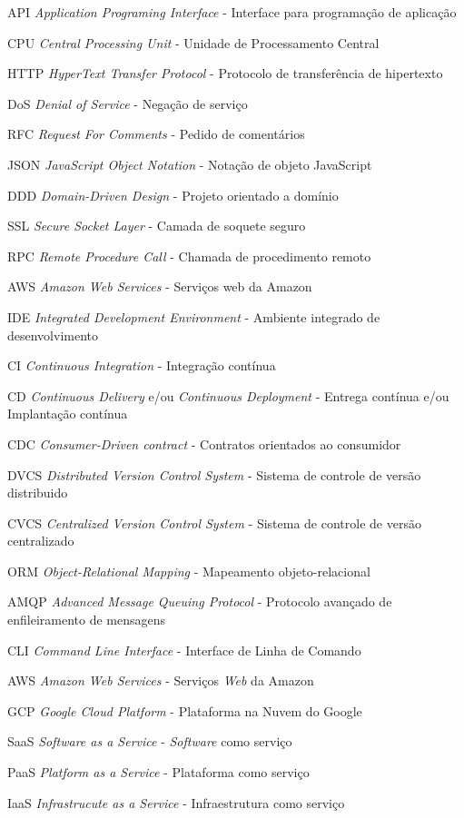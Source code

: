 
\begin{siglas}
	\item[API]{\emph{Application Programing Interface} - Interface para programação de aplicação}
	\item[CPU]{\emph{Central Processing Unit} - Unidade de Processamento Central}
	\item[HTTP]{\emph{HyperText Transfer Protocol} - Protocolo de transferência de hipertexto}
	\item[DoS]{\emph{Denial of Service} - Negação de serviço}
	\item[RFC]{\emph{Request For Comments} - Pedido de comentários}
	\item[JSON]{\emph{JavaScript Object Notation} - Notação de objeto JavaScript}
	\item[DDD]{\emph{Domain-Driven Design} - Projeto orientado a domínio}
	\item[SSL]{\emph{Secure Socket Layer} - Camada de soquete seguro}
	\item[RPC]{\emph{Remote Procedure Call} - Chamada de procedimento remoto}
	\item[AWS]{\emph{Amazon Web Services} - Serviços web da Amazon}
	\item[IDE]{\emph{Integrated Development Environment} - Ambiente integrado de desenvolvimento}
	\item[CI]{\emph{Continuous Integration} - Integração contínua}
	\item[CD]{\emph{Continuous Delivery} e/ou \emph{Continuous Deployment} - Entrega contínua e/ou Implantação contínua}
	\item[CDC]{\emph{Consumer-Driven contract} - Contratos orientados ao consumidor}
	\item[DVCS]{\emph{Distributed Version Control System} - Sistema de controle de versão distribuido}
	\item[CVCS]{\emph{Centralized Version Control System} - Sistema de controle de versão centralizado}
	\item[ORM]{\emph{Object-Relational Mapping} - Mapeamento objeto-relacional}
	\item[AMQP]{\emph{Advanced Message Queuing Protocol} - Protocolo avançado de enfileiramento de mensagens}
	\item[CLI]{\emph{Command Line Interface} - Interface de Linha de Comando}
	\item[AWS]{\emph{Amazon Web Services} - Serviços \emph{Web} da Amazon}
	\item[GCP]{\emph{Google Cloud Platform} - Plataforma na Nuvem do Google}
	\item[SaaS]{\emph{Software as a Service} - \emph{Software} como serviço}
	\item[PaaS]{\emph{Platform as a Service} - Plataforma como serviço}
	\item[IaaS]{\emph{Infrastrucute as a Service} - Infraestrutura como serviço}
\end{siglas}